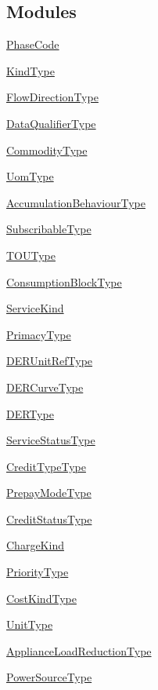 \subsection*{Modules}
\begin{DoxyCompactItemize}
\item 
\hyperlink{group__PhaseCode}{Phase\+Code}
\item 
\hyperlink{group__KindType}{Kind\+Type}
\item 
\hyperlink{group__FlowDirectionType}{Flow\+Direction\+Type}
\item 
\hyperlink{group__DataQualifierType}{Data\+Qualifier\+Type}
\item 
\hyperlink{group__CommodityType}{Commodity\+Type}
\item 
\hyperlink{group__UomType}{Uom\+Type}
\item 
\hyperlink{group__AccumulationBehaviourType}{Accumulation\+Behaviour\+Type}
\item 
\hyperlink{group__SubscribableType}{Subscribable\+Type}
\item 
\hyperlink{group__TOUType}{T\+O\+U\+Type}
\item 
\hyperlink{group__ConsumptionBlockType}{Consumption\+Block\+Type}
\item 
\hyperlink{group__ServiceKind}{Service\+Kind}
\item 
\hyperlink{group__PrimacyType}{Primacy\+Type}
\item 
\hyperlink{group__DERUnitRefType}{D\+E\+R\+Unit\+Ref\+Type}
\item 
\hyperlink{group__DERCurveType}{D\+E\+R\+Curve\+Type}
\item 
\hyperlink{group__DERType}{D\+E\+R\+Type}
\item 
\hyperlink{group__ServiceStatusType}{Service\+Status\+Type}
\item 
\hyperlink{group__CreditTypeType}{Credit\+Type\+Type}
\item 
\hyperlink{group__PrepayModeType}{Prepay\+Mode\+Type}
\item 
\hyperlink{group__CreditStatusType}{Credit\+Status\+Type}
\item 
\hyperlink{group__ChargeKind}{Charge\+Kind}
\item 
\hyperlink{group__PriorityType}{Priority\+Type}
\item 
\hyperlink{group__CostKindType}{Cost\+Kind\+Type}
\item 
\hyperlink{group__UnitType}{Unit\+Type}
\item 
\hyperlink{group__ApplianceLoadReductionType}{Appliance\+Load\+Reduction\+Type}
\item 
\hyperlink{group__PowerSourceType}{Power\+Source\+Type}
\end{DoxyCompactItemize}
